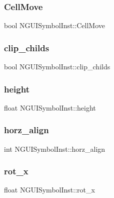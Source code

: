 \subsubsection{\texorpdfstring{Cell\+Move}{CellMove}}
{\footnotesize\ttfamily bool N\+G\+U\+I\+Symbol\+Inst\+::\+Cell\+Move}

\hypertarget{class_n_g_u_i_symbol_inst_ad091c8c1a934c1d782102e1e2b99a6a8}{}\label{class_n_g_u_i_symbol_inst_ad091c8c1a934c1d782102e1e2b99a6a8} 
\subsubsection{\texorpdfstring{clip\+\_\+childs}{clip\_childs}}
{\footnotesize\ttfamily bool N\+G\+U\+I\+Symbol\+Inst\+::clip\+\_\+childs}

\hypertarget{class_n_g_u_i_symbol_inst_a1c0ad8b480d3911404671ca978b947cb}{}\label{class_n_g_u_i_symbol_inst_a1c0ad8b480d3911404671ca978b947cb} 
\subsubsection{\texorpdfstring{height}{height}}
{\footnotesize\ttfamily float N\+G\+U\+I\+Symbol\+Inst\+::height}

\hypertarget{class_n_g_u_i_symbol_inst_a08a1618237027dd91cdab7928ff9ad48}{}\label{class_n_g_u_i_symbol_inst_a08a1618237027dd91cdab7928ff9ad48} 
\subsubsection{\texorpdfstring{horz\+\_\+align}{horz\_align}}
{\footnotesize\ttfamily int N\+G\+U\+I\+Symbol\+Inst\+::horz\+\_\+align}

\hypertarget{class_n_g_u_i_symbol_inst_a20bbcca67767c0ed9b3e40e6f3cd0357}{}\label{class_n_g_u_i_symbol_inst_a20bbcca67767c0ed9b3e40e6f3cd0357} 
\subsubsection{\texorpdfstring{rot\+\_\+x}{rot\_x}}
{\footnotesize\ttfamily float N\+G\+U\+I\+Symbol\+Inst\+::rot\+\_\+x}

